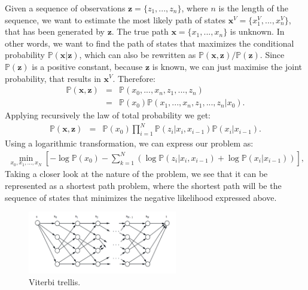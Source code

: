 \documentclass[a4paper, 11pt]{article} %
\begin{document}
Given a sequence of observations $\textbf{z} = \{ z_{1},..., z_{n} \}$, where $n$ is the length of the sequence, we want to estimate the most likely path of states $\textbf{x}^V = \{ x_{1}^V, ..., x_{n}^V \}$, that has been generated by $\textbf{z}$. The true path $\textbf{x} = \{ x_{1}, ..., x_{n} \}$ is unknown. In other words, we want to find the path of states that maximizes the conditional probability $\mathbb{P}(\textbf{x} | \textbf{z})$, which can also be rewritten as $\mathbb{P}(\textbf{x},\textbf{z})/\mathbb{P}(\textbf{z})$. Since $\mathbb{P}(\textbf{z})$ is a positive constant, because $\textbf{z}$ is known, we can just maximise the joint probability, that results in $\textbf{x}^V$. Therefore:
\begin{eqnarray}
\mathbb{P}(\textbf{x}, \textbf{z}) &=& \mathbb{P}(x_{0},...,x_{n},z_{1},...,z_{n})  \nonumber \\
&=& \mathbb{P}(x_{0})\mathbb{P}(x_{1},...,x_{n},z_{1},...,z_{n} | x_{0}).  \nonumber
\end{eqnarray}
Applying recursively the law of total probability we get:
\begin{eqnarray}
\mathbb{P}(\textbf{x}, \textbf{z}) &=& \mathbb{P}(x_{0}) \prod^{N}_{i=1} \mathbb{P}(z_i | x_i, x_{i-1}) \mathbb{P}(x_i | x_{i-1}).   \nonumber
\end{eqnarray}
Using a logarithmic transformation, we can express our problem as:
\begin{eqnarray}
\min_{x_0, x_1, \dots, x_N} \left[ -\log \mathbb{P}(x_{0}) - \sum^{N}_{k=1} \left( \log \mathbb{P}(z_i | x_i, x_{i-1}) + \log \mathbb{P}(x_i | x_{i-1}) \right) \right],  \nonumber
\end{eqnarray}
Taking a closer look at the nature of the problem, we see that it can be represented as a shortest path problem, where the shortest path will be the sequence of states that minimizes the negative likelihood expressed above.

\begin{figure} %
\begin{center}
\includegraphics[width=0.58\textwidth]{trellis.png}
\end{center}
\caption{Viterbi trellis.}
\end{figure}
\end{document}
